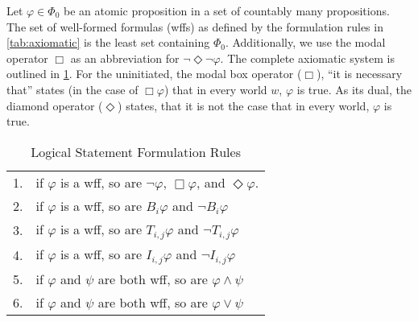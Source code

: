 Let $\varphi \in \Phi_0$ be an atomic proposition in a set of countably many propositions. The set of well-formed formulas (wffs) as defined by the formulation rules in \ref{tab:axiomatic} is the least set containing $\Phi_0$. Additionally, we use the modal operator $\Box$ as an abbreviation for $\neg \Diamond \neg \varphi$. The complete axiomatic system is outlined in \ref{tab:wffs}. For the uninitiated, the modal box operator ($\Box$), ``it is necessary that'' states (in the case of $\Box \varphi$) that in every world $w$, $\varphi$ is true. As its dual, the diamond operator ($\Diamond$) states, that it is not the case that in every world, $\varphi$ is true.

\begin{table}[]
\small
\centering
\caption{Logical Statement Formulation Rules}
\begin{tabular}{r l}
1. & if $\varphi$ is a wff, so are $\neg \varphi$, $\Box \varphi$, and $\Diamond \varphi$. \\
2. & if $\varphi$ is a wff, so are $B_i \varphi$ and $\neg B_i \varphi$ \\
3. & if $\varphi$ is a wff, so are $T_{i,j} \varphi$ and $\neg T_{i,j} \varphi$ \\
4. & if $\varphi$ is a wff, so are $I_{i,j} \varphi$ and $\neg I_{i,j} \varphi$ \\
5. & if $\varphi$ and $\psi$ are both wff, so are $\varphi \wedge \psi$ \\
6. & if $\varphi$ and $\psi$ are both wff, so are $\varphi \vee \psi$ \\
\end{tabular}
\label{tab:wffs}
\end{table}

